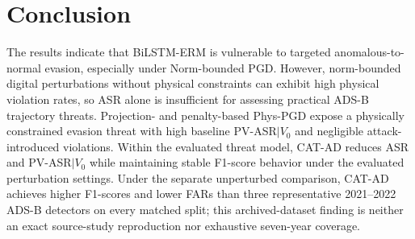 \documentclass[runningheads]{llncs}
\begin{document}
\FloatBarrier

\section{Conclusion}
\label{sec:conclusion}

The results indicate that BiLSTM-ERM is vulnerable to targeted anomalous-to-normal evasion, especially under Norm-bounded PGD.
However, norm-bounded digital perturbations without physical constraints can exhibit high physical violation rates, so ASR alone is insufficient for assessing practical ADS-B trajectory threats.
Projection- and penalty-based Phys-PGD expose a physically constrained evasion threat with high baseline PV-ASR$\mid V_0$ and negligible attack-introduced violations.
Within the evaluated threat model, CAT-AD reduces ASR and PV-ASR$\mid V_0$ while maintaining stable F1-score behavior under the evaluated perturbation settings.
Under the separate unperturbed comparison, CAT-AD achieves higher F1-scores and lower FARs than three representative 2021--2022 ADS-B detectors on every matched split; this archived-dataset finding is neither an exact source-study reproduction nor exhaustive seven-year coverage.


\end{document}
